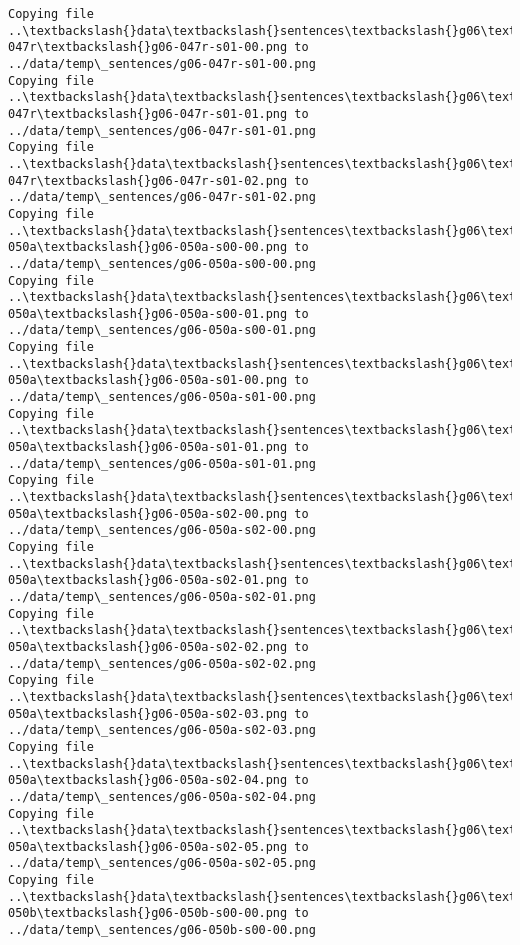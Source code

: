 \documentclass[11pt]{article}
\begin{document}
\begin{Verbatim}[commandchars=\\\{\}]
Copying file ..\textbackslash{}data\textbackslash{}sentences\textbackslash{}g06\textbackslash{}g06-047r\textbackslash{}g06-047r-s01-00.png to
../data/temp\_sentences/g06-047r-s01-00.png
Copying file ..\textbackslash{}data\textbackslash{}sentences\textbackslash{}g06\textbackslash{}g06-047r\textbackslash{}g06-047r-s01-01.png to
../data/temp\_sentences/g06-047r-s01-01.png
Copying file ..\textbackslash{}data\textbackslash{}sentences\textbackslash{}g06\textbackslash{}g06-047r\textbackslash{}g06-047r-s01-02.png to
../data/temp\_sentences/g06-047r-s01-02.png
Copying file ..\textbackslash{}data\textbackslash{}sentences\textbackslash{}g06\textbackslash{}g06-050a\textbackslash{}g06-050a-s00-00.png to
../data/temp\_sentences/g06-050a-s00-00.png
Copying file ..\textbackslash{}data\textbackslash{}sentences\textbackslash{}g06\textbackslash{}g06-050a\textbackslash{}g06-050a-s00-01.png to
../data/temp\_sentences/g06-050a-s00-01.png
Copying file ..\textbackslash{}data\textbackslash{}sentences\textbackslash{}g06\textbackslash{}g06-050a\textbackslash{}g06-050a-s01-00.png to
../data/temp\_sentences/g06-050a-s01-00.png
Copying file ..\textbackslash{}data\textbackslash{}sentences\textbackslash{}g06\textbackslash{}g06-050a\textbackslash{}g06-050a-s01-01.png to
../data/temp\_sentences/g06-050a-s01-01.png
Copying file ..\textbackslash{}data\textbackslash{}sentences\textbackslash{}g06\textbackslash{}g06-050a\textbackslash{}g06-050a-s02-00.png to
../data/temp\_sentences/g06-050a-s02-00.png
Copying file ..\textbackslash{}data\textbackslash{}sentences\textbackslash{}g06\textbackslash{}g06-050a\textbackslash{}g06-050a-s02-01.png to
../data/temp\_sentences/g06-050a-s02-01.png
Copying file ..\textbackslash{}data\textbackslash{}sentences\textbackslash{}g06\textbackslash{}g06-050a\textbackslash{}g06-050a-s02-02.png to
../data/temp\_sentences/g06-050a-s02-02.png
Copying file ..\textbackslash{}data\textbackslash{}sentences\textbackslash{}g06\textbackslash{}g06-050a\textbackslash{}g06-050a-s02-03.png to
../data/temp\_sentences/g06-050a-s02-03.png
Copying file ..\textbackslash{}data\textbackslash{}sentences\textbackslash{}g06\textbackslash{}g06-050a\textbackslash{}g06-050a-s02-04.png to
../data/temp\_sentences/g06-050a-s02-04.png
Copying file ..\textbackslash{}data\textbackslash{}sentences\textbackslash{}g06\textbackslash{}g06-050a\textbackslash{}g06-050a-s02-05.png to
../data/temp\_sentences/g06-050a-s02-05.png
Copying file ..\textbackslash{}data\textbackslash{}sentences\textbackslash{}g06\textbackslash{}g06-050b\textbackslash{}g06-050b-s00-00.png to
../data/temp\_sentences/g06-050b-s00-00.png

\end{Verbatim}
\end{document}

